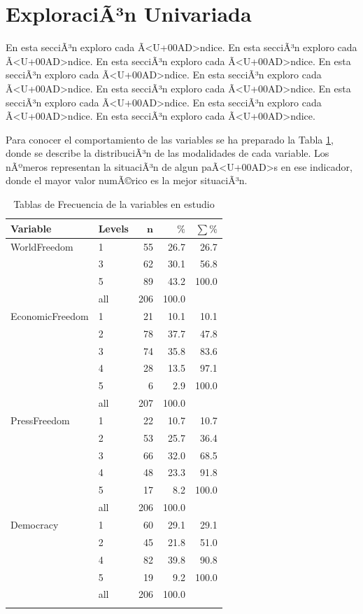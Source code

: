 \documentclass{article}
\begin{document}
\section{ExploraciÃ³n Univariada}\label{univariada}

En esta secciÃ³n exploro cada Ã<U+00AD>ndice. En esta secciÃ³n exploro cada Ã<U+00AD>ndice. En esta secciÃ³n exploro cada Ã<U+00AD>ndice. En esta secciÃ³n exploro cada Ã<U+00AD>ndice. En esta secciÃ³n exploro cada Ã<U+00AD>ndice. En esta secciÃ³n exploro cada Ã<U+00AD>ndice. En esta secciÃ³n exploro cada Ã<U+00AD>ndice. En esta secciÃ³n exploro cada Ã<U+00AD>ndice. En esta secciÃ³n exploro cada Ã<U+00AD>ndice.





Para conocer el comportamiento de las variables se ha preparado la Tabla \ref{Tfrecuencias}, donde se describe la distribuciÃ³n de las modalidades de cada variable. Los nÃºmeros representan la situaciÃ³n de algun paÃ<U+00AD>s en ese indicador, donde el mayor valor numÃ©rico es la mejor situaciÃ³n.

\begingroup\normalsize
\begin{longtable}{llrrr}
\caption{Tablas de Frecuencia de la variables en estudio} \\ 
 \textbf{Variable} & \textbf{Levels} & $\mathbf{n}$ & $\mathbf{\%}$ & $\mathbf{\sum \%}$ \\ 
  \hline \hline
WorldFreedom & 1 & 55 & 26.7 & 26.7 \\ 
   & 3 & 62 & 30.1 & 56.8 \\ 
   & 5 & 89 & 43.2 & 100.0 \\ 
   \hline
 & all & 206 & 100.0 &  \\ 
   \hline
\hline
EconomicFreedom & 1 & 21 & 10.1 & 10.1 \\ 
   & 2 & 78 & 37.7 & 47.8 \\ 
   & 3 & 74 & 35.8 & 83.6 \\ 
   & 4 & 28 & 13.5 & 97.1 \\ 
   & 5 & 6 & 2.9 & 100.0 \\ 
   \hline
 & all & 207 & 100.0 &  \\ 
   \hline
\hline
PressFreedom & 1 & 22 & 10.7 & 10.7 \\ 
   & 2 & 53 & 25.7 & 36.4 \\ 
   & 3 & 66 & 32.0 & 68.5 \\ 
   & 4 & 48 & 23.3 & 91.8 \\ 
   & 5 & 17 & 8.2 & 100.0 \\ 
   \hline
 & all & 206 & 100.0 &  \\ 
   \hline
\hline
Democracy & 1 & 60 & 29.1 & 29.1 \\ 
   & 2 & 45 & 21.8 & 51.0 \\ 
   & 4 & 82 & 39.8 & 90.8 \\ 
   & 5 & 19 & 9.2 & 100.0 \\ 
   \hline
 & all & 206 & 100.0 &  \\ 
   \hline
\hline
\hline
\label{Tfrecuencias}
\end{longtable}
\endgroup
\end{document}
